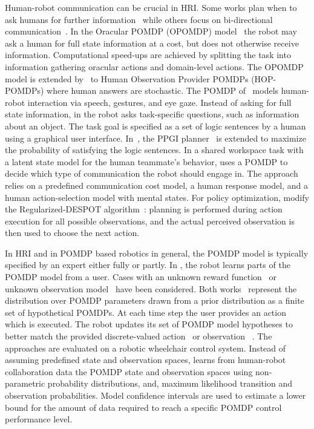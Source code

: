 \documentclass[journal]{IEEEtran}
\begin{document}
%
Human-robot communication can be crucial in HRI.
Some works plan when to ask humans for further
information~\cite{armstrong2007oracular,rosenthal2011modeling,hoelscher2018utilizing}
while others focus on bi-directional
communication~\cite{rosen2020mixed,unhelkar2020decision}.
%
%
In the Oracular POMDP (OPOMDP) model~\cite{armstrong2007oracular} the robot may ask a human for full
state information at a cost, but does not otherwise receive
information.
Computational speed-ups are achieved by splitting the task into information gathering oracular actions and
domain-level actions.
The OPOMDP model is extended by~\cite{rosenthal2011modeling} to
Human Observation Provider POMDPs (HOP-POMDPs) where human answers are
stochastic.
The POMDP of~\cite{rosen2020mixed} models human-robot interaction via speech, gestures, and eye gaze.
Instead of asking for full state information, in
\cite{hoelscher2018utilizing} the robot asks task-specific questions, such as information about an object.
The task goal is specified as a set of logic sentences by a human using a
graphical user interface.
In~\cite{hoelscher2018utilizing}, the
PPGI planner~\cite{pajarinen2017robotic} is extended to
maximize the probability of satisfying the logic sentences.
In a shared workspace task with a latent state model for the human teammate's behavior, \cite{unhelkar2020decision} uses a POMDP to decide which type of communication the robot should engage in.
The approach relies
on a predefined communication cost model, a human response model, and
a human action-selection model with mental
states. For policy optimization, \cite{unhelkar2019semi,unhelkar2020decision}
modify the Regularized-DESPOT
algorithm~\cite{somani2013despot}: planning is performed during action execution
for all possible observations, and the actual perceived
observation is then used to choose the next action.

%
In HRI and in POMDP based robotics in general, the POMDP model is
typically specified by an expert either fully or partly. In
\cite{atrash2009bayesian,atrash2010bayesian}, the robot learns parts
of the POMDP model from a user.
Cases with an unknown reward function~\cite{atrash2009bayesian} or unknown observation model~\cite{atrash2010bayesian} have been considered.
Both works~\cite{atrash2009bayesian,atrash2010bayesian}
represent the distribution over POMDP parameters drawn from a prior
distribution as a finite set of hypothetical POMDPs. At each time step
the user provides an action which is executed. The robot updates its
set of POMDP model hypotheses to better match the provided discrete-valued action~\cite{atrash2009bayesian} or observation~ \cite{atrash2010bayesian}.
The approaches are evaluated on a robotic wheelchair
control system. Instead of assuming predefined state and observation
spaces, \cite{zheng2018pomdp} learns from human-robot collaboration
data the POMDP state and observation spaces using non-parametric
probability distributions, and, maximum likelihood transition and
observation probabilities.
Model confidence intervals are used to estimate a lower bound for the amount of data required to
reach a specific POMDP control performance level.
\end{document}
